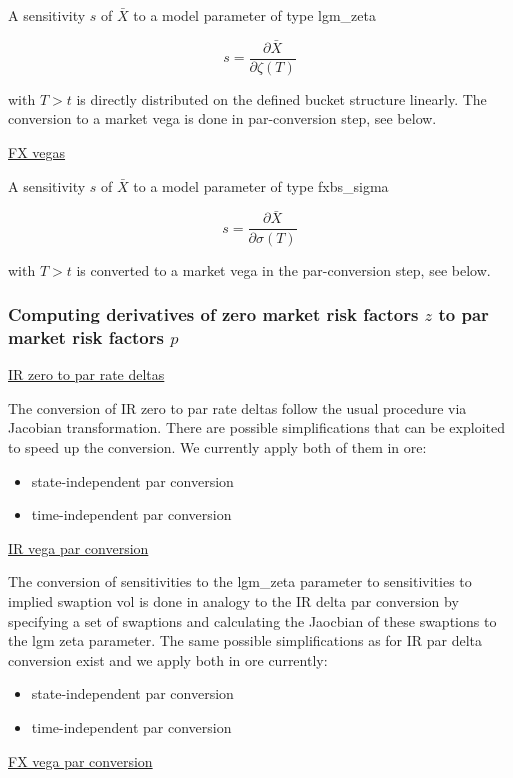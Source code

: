A sensitivity $s$ of $\bar{X}$ to a model parameter of type lgm\_zeta

$$
s = \frac{\partial\bar{X}}{\partial \zeta(T)}
$$

with $T>t$ is directly distributed on the defined bucket structure linearly. The conversion to a market vega is done in
par-conversion step, see below.


\underline{FX vegas}

A sensitivity $s$ of $\bar{X}$ to a model parameter of type fxbs\_sigma

$$
s = \frac{\partial\bar{X}}{\partial \sigma(T)}
$$

with $T>t$ is converted to a market vega in the par-conversion step, see below.


\subsubsection{Computing derivatives of zero market risk factors $z$ to par market risk factors $p$}

\underline{IR zero to par rate deltas}

The conversion of IR zero to par rate deltas follow the usual procedure via Jacobian transformation. There are possible simplifications that can be exploited to speed up the conversion. We currently apply both of them in ore:

\begin{itemize}
\item state-independent par conversion
\item time-independent par conversion
\end{itemize}

\underline{IR vega par conversion}

The conversion of sensitivities to the lgm\_zeta parameter to sensitivities to implied swaption vol is done in analogy
to the IR delta par conversion by specifying a set of swaptions and calculating the Jaocbian of these swaptions to the
lgm zeta parameter. The same possible simplifications as for IR par delta conversion exist and we apply both in ore
currently:

\begin{itemize}
\item state-independent par conversion
\item time-independent par conversion
\end{itemize}

\underline{FX vega par conversion}

